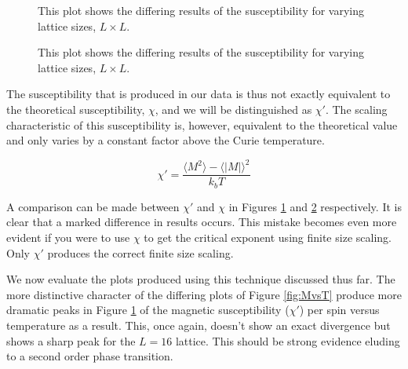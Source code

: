 \documentclass[a4paper]{article}
\begin{document}
\begin{figure}[htb]
  \centering
  \caption{This plot shows the differing results of the susceptibility
    for varying lattice
    sizes, $L\times L$.} \label{fig:X'vsT}
\end{figure}

\begin{figure}[htb]
  \centering
  \caption{This plot shows the differing results of the susceptibility
    for varying lattice
    sizes, $L\times L$.}\label{fig:XvsT}
\end{figure} 
The susceptibility that is produced in our data is thus not exactly
equivalent to the theoretical susceptibility, $\chi$, and we will be
distinguished as $\chi'$. The scaling characteristic of this
susceptibility is, however, equivalent to the theoretical value and only
varies by a constant factor above the Curie temperature.

\begin{equation}
  \label{eq:X'}
  \chi'= \frac{\langle M^2 \rangle - \langle |M| \rangle^2}{k_b T}
\end{equation}

A comparison can be made between $\chi'$ and $\chi$ in Figures
\ref{fig:X'vsT} and \ref{fig:XvsT} respectively. It is clear that a
marked difference in results occurs. This mistake becomes even more
evident if you were to use $\chi$ to get the critical exponent using
finite size scaling. Only $\chi'$ produces the correct finite size
scaling.

We now evaluate the plots produced using this technique discussed
thus far. The more distinctive character of the differing plots of Figure
\ref{fig:MvsT} produce more dramatic peaks in Figure
\ref{fig:X'vsT} of the magnetic susceptibility ($\chi'$) per spin versus
temperature as a result. This, once again, doesn't show an exact
divergence but shows a sharp peak for the $L=16$ lattice. This should be
strong evidence eluding to a second order phase transition.
\afterpage{\clearpage}
\end{document}
